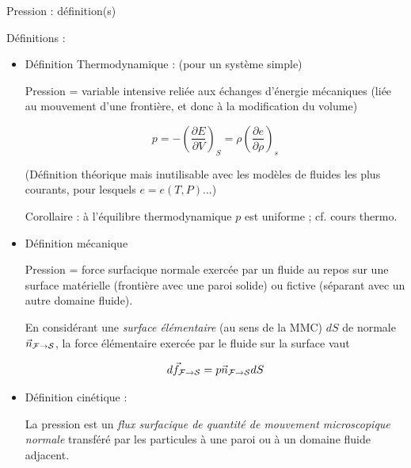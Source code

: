 \begin{frame}{Pression : définition(s)}

\small

Définitions : 

\begin{itemize}[<+-| alert@+>]
\item Définition Thermodynamique : (pour un système simple)

Pression = variable intensive reliée aux échanges d'énergie mécaniques 
(liée au mouvement d'une frontière, et donc à la modification du volume) 

$$
p = - {\left( \frac{\partial E}{\partial V} \right)}_{S} = \rho {\left( \frac{\partial e}{\partial \rho} \right)}_{s} 
$$  


(Définition théorique mais inutilisable avec les modèles de fluides les plus courants, pour lesquels $e = e(T,P)...$)

Corollaire : à l'équilibre thermodynamique $p$ est uniforme ; cf. cours thermo.


\item Définition mécanique 

Pression = force surfacique normale exercée par un fluide au repos sur une surface matérielle (frontière avec une paroi solide)
 ou fictive (séparant avec un autre domaine fluide).

En considérant une {\em surface élémentaire} (au sens de la MMC) $dS$ de normale $\vec{n}_{{\cal F} \rightarrow {\cal S} }$, la force élémentaire exercée par le fluide sur la surface vaut 

$$
d \vec{f}_{{\cal F} \rightarrow {\cal S} } = p  \vec{n}_{{\cal F} \rightarrow {\cal S} } d S
$$

\pause


\pause 
\item Définition cinétique :

La pression est un {\em flux surfacique de quantité de mouvement microscopique normale} transféré par les particules à une paroi ou à un domaine fluide adjacent.



\end{itemize}


\end{frame}



